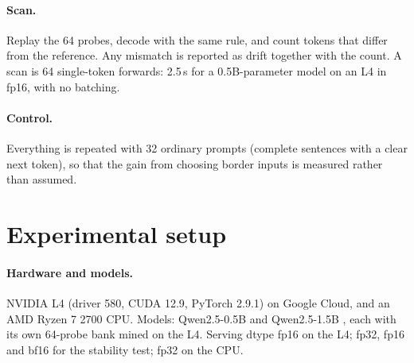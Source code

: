 \documentclass[11pt]{article}
\begin{document}
\paragraph{Scan.}
Replay the 64 probes, decode with the same rule, and count tokens that differ from the reference. Any mismatch is reported as drift together with the count. A scan is 64 single-token forwards: 2.5\,s for a 0.5B-parameter model on an L4 in fp16, with no batching.

\paragraph{Control.}
Everything is repeated with 32 ordinary prompts (complete sentences with a clear next token), so that the gain from choosing border inputs is measured rather than assumed.

\section{Experimental setup}

\paragraph{Hardware and models.}
NVIDIA L4 (driver 580, CUDA 12.9, PyTorch 2.9.1) on Google Cloud, and an AMD Ryzen 7 2700 CPU. Models: Qwen2.5-0.5B and Qwen2.5-1.5B \citep{qwen2025qwen25}, each with its own 64-probe bank mined on the L4. Serving dtype fp16 on the L4; fp32, fp16 and bf16 for the stability test; fp32 on the CPU.
\end{document}
